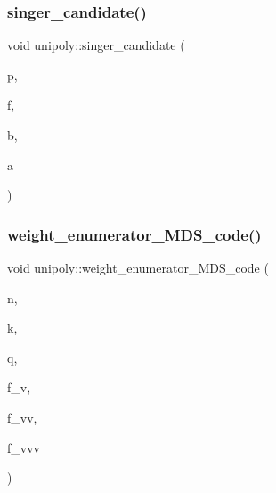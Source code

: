 \mbox{\label{classunipoly_a53231caafb097fc75404538383b88197}} 
\subsubsection{\texorpdfstring{singer\+\_\+candidate()}{singer\_candidate()}}
{\footnotesize\ttfamily void unipoly\+::singer\+\_\+candidate (\begin{DoxyParamCaption}\item[{\mbox{\hyperlink{galois_8h_a09fddde158a3a20bd2dcadb609de11dc}{I\+NT}}}]{p,  }\item[{\mbox{\hyperlink{galois_8h_a09fddde158a3a20bd2dcadb609de11dc}{I\+NT}}}]{f,  }\item[{\mbox{\hyperlink{galois_8h_a09fddde158a3a20bd2dcadb609de11dc}{I\+NT}}}]{b,  }\item[{\mbox{\hyperlink{galois_8h_a09fddde158a3a20bd2dcadb609de11dc}{I\+NT}}}]{a }\end{DoxyParamCaption})}

\mbox{\label{classunipoly_ad9a4b7b883285271fc39528f74755a07}} 
\subsubsection{\texorpdfstring{weight\+\_\+enumerator\+\_\+\+M\+D\+S\+\_\+code()}{weight\_enumerator\_MDS\_code()}}
{\footnotesize\ttfamily void unipoly\+::weight\+\_\+enumerator\+\_\+\+M\+D\+S\+\_\+code (\begin{DoxyParamCaption}\item[{\mbox{\hyperlink{galois_8h_a09fddde158a3a20bd2dcadb609de11dc}{I\+NT}}}]{n,  }\item[{\mbox{\hyperlink{galois_8h_a09fddde158a3a20bd2dcadb609de11dc}{I\+NT}}}]{k,  }\item[{\mbox{\hyperlink{galois_8h_a09fddde158a3a20bd2dcadb609de11dc}{I\+NT}}}]{q,  }\item[{\mbox{\hyperlink{galois_8h_a09fddde158a3a20bd2dcadb609de11dc}{I\+NT}}}]{f\+\_\+v,  }\item[{\mbox{\hyperlink{galois_8h_a09fddde158a3a20bd2dcadb609de11dc}{I\+NT}}}]{f\+\_\+vv,  }\item[{\mbox{\hyperlink{galois_8h_a09fddde158a3a20bd2dcadb609de11dc}{I\+NT}}}]{f\+\_\+vvv }\end{DoxyParamCaption})}

